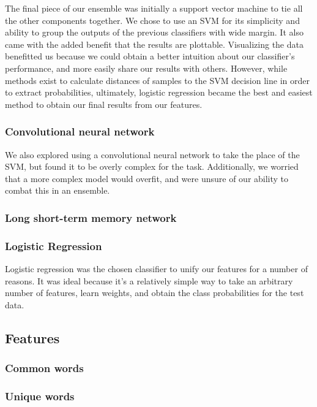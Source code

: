 \documentclass{article}
\begin{document}
The final piece of our ensemble was initially a support vector machine to tie
all the other components together. We chose to use an SVM for its simplicity and
ability to group the outputs of the previous classifiers with wide margin. It
also came with the added benefit that the results are plottable. Visualizing the
data benefitted us because we could obtain a better intuition about our
classifier's performance, and more easily share our results with others. However,
while methods exist to calculate distances of samples to the SVM decision line
in order to extract probabilities, ultimately,  logistic regression became the
best and easiest method to obtain our final results from our features.

\subsubsection{Convolutional neural network}

We also explored using a convolutional neural network to take the place of the
SVM, but found it to be overly complex for the task. Additionally, we worried
that a more complex model would overfit, and were unsure of our ability to
combat this in an ensemble.

\subsubsection{Long short-term memory network}

\subsubsection{Logistic Regression}

Logistic regression was the chosen classifier to unify our features for a number
of reasons. It was ideal because it's a relatively simple way to take an
arbitrary number of features, learn weights, and obtain the class probabilities
for the test data.

\subsection{Features}

\subsubsection{Common words}

\subsubsection{Unique words}
\end{document}
